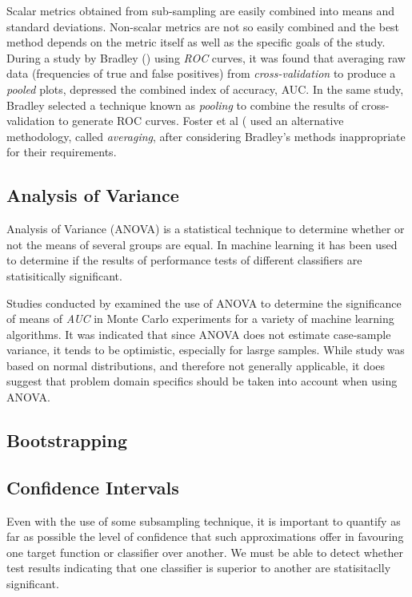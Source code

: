 \documentclass[10pt]{unbthesis}
\begin{document}
Scalar metrics obtained from sub-sampling are easily combined into
means and standard deviations. Non-scalar metrics are not so easily
combined and the best method depends on the metric itself as well as
the specific goals of the study. During a
study by Bradley (\cite{RefWorks:32}) using \textit{ROC} curves, it was found
that averaging raw data (frequencies of true and false positives) from
\textit{cross-validation} to produce a \textit{pooled} plots,
depressed the combined index of accuracy, AUC. In the same study,
Bradley selected a technique known as \textit{pooling} to combine the
results of cross-validation to generate ROC curves. Foster et al
(\cite{RefWorks:45} used an alternative methodology, called
\textit{averaging}, after considering Bradley's methods inappropriate
for their requirements.

\subsection{Analysis of Variance}
Analysis of Variance (ANOVA) is a statistical technique to
determine whether or not the means of several groups are equal. In
machine learning it has been used to determine if the results of
performance tests of different classifiers are statisitically
significant.

Studies conducted by \cite{RefWorks:38} examined
the use of ANOVA to determine the significance of means of
\textit{AUC} in Monte Carlo experiments for a
variety of machine learning algorithms. It was indicated that since
ANOVA does not estimate case-sample variance, it tends to be
optimistic, especially for lasrge samples. While study was based on
normal distributions, and therefore not generally applicable, it does
suggest that problem domain specifics should be taken into account
when using ANOVA.

\subsection{Bootstrapping}


\subsection{Confidence Intervals}
Even with the use of some subsampling technique, it is important to
quantify as far as possible the level of confidence that such
approximations offer in favouring one target function or classifier
over another.  We must be able to detect whether test results
indicating that one classifier is superior to another are
statisitaclly significant. 
\end{document}
